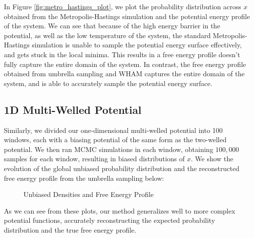 \documentclass{article}
\begin{document}
In Figure \ref{fig:metro_hastings_plot}, we plot the probability distribution across $x$ obtained from the Metropolis-Hastings simulation and the potential energy profile of the system. We can see that because of the high energy barrier in the potential, as well as the low temperature of the system, the standard Metropolis-Hastings simulation is unable to sample the potential energy surface effectively, and gets stuck in the local minima. This results in a free energy profile doesn't fully capture the entire domain of the system. In contrast, the free energy profile obtained from umbrella sampling and WHAM captures the entire domain of the system, and is able to accurately sample the potential energy surface.

\subsection{1D Multi-Welled Potential}

Similarly, we divided our one-dimensional multi-welled potential into 100 windows, each with a biasing potential of the same form as the two-welled potential. We then ran MCMC simulations in each window, obtaining $100,000$ samples for each window, resulting in biased distributions of $x$. We show the evolution of the global unbiased probability distribution and the reconstructed free energy profile from the umbrella sampling below:

\begin{figure}[h]%
    \centering
    \qquad
    \caption{Unbiased Densities and Free Energy Profile}%
    \label{fig:unbiased_densities}%
\end{figure}
As we can see from these plots, our method generalizes well to more complex potential functions, accurately reconstructing the expected probability distribution and the true free energy profile. 
\end{document}
